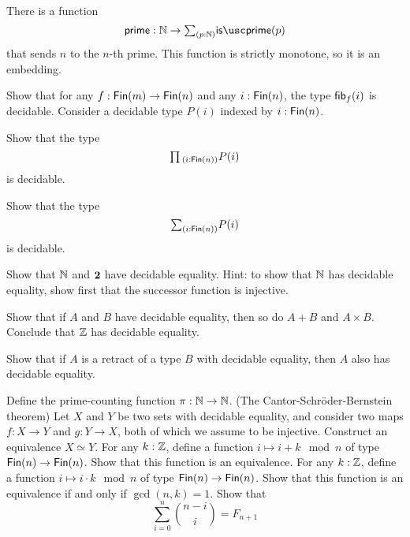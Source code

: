 \begin{cor}
  There is a function
  \begin{equation*}
    \primetype : \N \to \sm{p:\N}\isprime(p)
  \end{equation*}
  that sends $n$ to the $n$-th prime. This function is strictly monotone, so it is an embedding.
\end{cor}

\begin{exercises}
\exercise Show that for any $f:\mathsf{Fin}(m)\to\mathsf{Fin}(n)$ and any $i:\mathsf{Fin}(n)$, the type $\mathsf{fib}_{f}(i)$ is decidable.
\exercise Consider a decidable type $P(i)$ indexed by $i:\mathsf{Fin}(n)$.
  \begin{subexenum}
  \item Show that the type
    \begin{equation*}
      \prd{i:\Fin(n)}P(i)
    \end{equation*}
    is decidable.
  \item Show that the type
    \begin{equation*}
      \sm{i:\Fin(n)}P(i)
    \end{equation*}
    is decidable.
  \end{subexenum}
\exercise
  \begin{subexenum}
  \item Show that ${\mathbb{N}}$ and $\mathbf{2}$ have decidable equality. Hint: to show that ${\mathbb{N}}$ has decidable equality, show first that the successor function is injective.
  \item Show that if $A$ and $B$ have decidable equality, then so do $A+B$ and $A\times B$. Conclude that ${\mathbb{Z}}$ has decidable equality.
  \item Show that if $A$ is a retract of a type $B$ with decidable equality, then $A$ also has decidable equality.
  \end{subexenum}
\exercise Define the prime-counting function $\pi:{\mathbb{N}}\to{\mathbb{N}}$.
\exercise (The Cantor-Schr\"oder-Bernstein theorem) Let $X$ and $Y$ be two sets with decidable equality, and consider two maps $f:X\to Y$ and $g:Y\to X$, both of which we assume to be injective. Construct an equivalence $X\simeq Y$.
\exercise For any $k:{\mathbb{Z}}$, define a function $i\mapsto i+k \mod n$ of type $\mathsf{Fin}(n)\to\mathsf{Fin}(n)$. Show that this function is an equivalence.
\exercise For any $k:{\mathbb{Z}}$, define a function $i\mapsto i\cdot k \mod n$ of type $\mathsf{Fin}(n)\to\mathsf{Fin}(n)$. Show that this function is an equivalence if and only if $\gcd(n,k)=1$.
\exercise Show that
  \begin{equation*}
    \sum_{i=0}^n \binom{n-i}{i}=F_{n+1}

\end{equation*}
\end{exercises}
